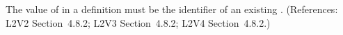 The value of  in a \Species definition must be the
identifier of an existing \SpeciesType.  (References: L2V2
Section~4.8.2; L2V3 Section~4.8.2; L2V4 Section~4.8.2.)
